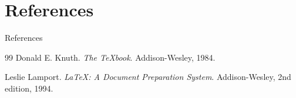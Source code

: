 \documentclass[aspectratio=169]{beamer}
\begin{document}
\section{References}
\begin{frame}[allowframebreaks]{References}
  \begin{thebibliography}{99}
      Donald E. Knuth.
      \newblock \textit{The \TeX book}.
      \newblock Addison-Wesley, 1984.

      Leslie Lamport.
      \newblock \textit{\LaTeX: A Document Preparation System}.
      \newblock Addison-Wesley, 2nd edition, 1994.
  \end{thebibliography}
\end{frame}
\end{document}
